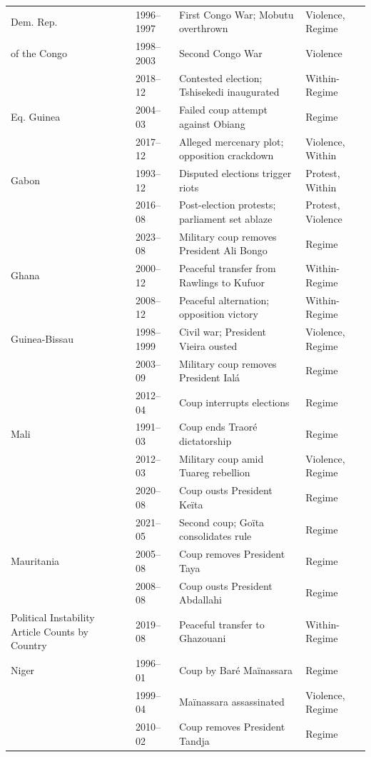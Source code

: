 \begin{table}[htbp]
\begin{tabular}{p{2.5cm} p{1.5cm} p{7.5cm} L{3cm}}
\midrule
Dem. Rep. & 1996--1997 & First Congo War; Mobutu overthrown & Violence, Regime \\
of the Congo & 1998--2003 & Second Congo War & Violence \\
             & 2018--12 & Contested election; Tshisekedi inaugurated & Within-Regime \\
\midrule
Eq. Guinea & 2004--03 & Failed coup attempt against Obiang & Regime \\
           & 2017--12 & Alleged mercenary plot; opposition crackdown & Violence, Within \\
\midrule
Gabon & 1993--12 & Disputed elections trigger riots & Protest, Within \\
      & 2016--08 & Post-election protests; parliament set ablaze & Protest, Violence \\
      & 2023--08 & Military coup removes President Ali Bongo & Regime \\
\midrule
Ghana & 2000--12 & Peaceful transfer from Rawlings to Kufuor & Within-Regime \\
      & 2008--12 & Peaceful alternation; opposition victory & Within-Regime \\
\midrule
Guinea-Bissau & 1998--1999 & Civil war; President Vieira ousted & Violence, Regime \\
              & 2003--09 & Military coup removes President Ialá & Regime \\
              & 2012--04 & Coup interrupts elections & Regime \\
\midrule
Mali & 1991--03 & Coup ends Traoré dictatorship & Regime \\
     & 2012--03 & Military coup amid Tuareg rebellion & Violence, Regime \\
     & 2020--08 & Coup ousts President Keïta & Regime \\
     & 2021--05 & Second coup; Goïta consolidates rule & Regime \\
\midrule
Mauritania & 2005--08 & Coup removes President Taya & Regime \\
            & 2008--08 & Coup ousts President Abdallahi & Regime \\Political Instability Article Counts by Country
            & 2019--08 & Peaceful transfer to Ghazouani & Within-Regime \\
\midrule
Niger & 1996--01 & Coup by Baré Maïnassara & Regime \\
       & 1999--04 & Maïnassara assassinated & Violence, Regime \\
       & 2010--02 & Coup removes President Tandja & Regime \\

\end{tabular}
\end{table}
